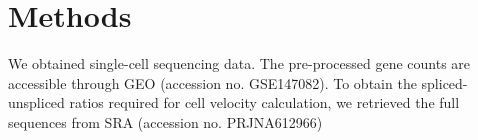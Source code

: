 \documentclass{article}
\begin{document}
\section{Methods}

We obtained single-cell sequencing data. \cite{olalekan2021characterizing} The
pre-processed gene counts are accessible through GEO (accession no. GSE147082).
To obtain the spliced-unspliced ratios required for cell velocity calculation,
we retrieved the full sequences from SRA (accession no. PRJNA612966)



\end{document}
